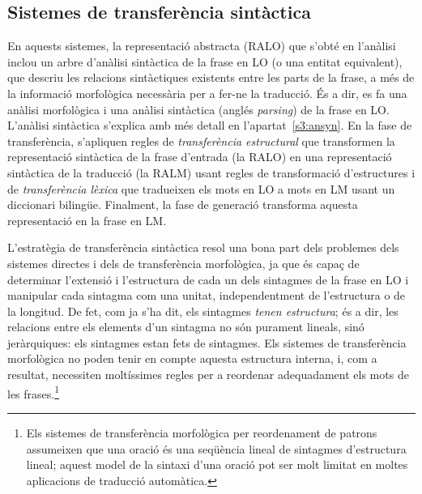 \subsection{Sistemes de transferència sintàctica} 
\label{s3:transyn}

En aquests sistemes, la representació abstracta (RALO) que s'obté en
l'anàlisi inclou un arbre d'anàlisi sintàctica de la frase en LO (o
una entitat equivalent), que descriu les relacions sintàctiques
existents entre les parts de la frase, a més de la informació
morfològica necessària per a fer-ne la traducció. És a dir, es fa una
anàlisi morfològica i una anàlisi sintàctica (anglés \emph{parsing})
de la frase en LO. L'anàlisi sintàctica s'explica amb més detall en
l'apartat~\ref{s3:ansyn}.  En la fase de transferència, s'apliquen
regles de \emph{transferència estructural} que transformen la
representació sintàctica de la frase d'entrada (la RALO) en una
representació sintàctica de la traducció (la RALM) usant regles de
transformació d'estructures i de \emph{transferència lèxica} que
tradueixen els mots en LO a mots en LM usant un diccionari bilingüe.
Finalment, la fase de generació transforma aquesta representació en la
frase en LM.

L'estratègia de transferència sintàctica resol una bona part dels
problemes dels sistemes directes i dels de transferència morfològica,
ja que és capaç de determinar l'extensió i l'estructura de cada un
dels sintagmes de la frase en LO i manipular cada sintagma com una
unitat, independentment de l'estructura o de la longitud.  De fet, com
ja s'ha dit, els sintagmes \emph{tenen estructura}; és a dir, les
relacions entre els elements d'un sintagma no són purament lineals,
sinó jeràrquiques: els sintagmes estan fets de sintagmes.  Els
sistemes de transferència morfològica no poden tenir en compte aquesta
estructura interna, i, com a resultat, necessiten moltíssimes regles
per a reordenar adequadament els mots de les frases.\footnote{Els
  sistemes de transferència morfològica per reordenament de patrons
  assumeixen que una oració és una seqüència lineal de sintagmes
  d'estructura lineal; aquest model de la sintaxi d'una oració pot ser
  molt limitat en moltes aplicacions de traducció automàtica.}


